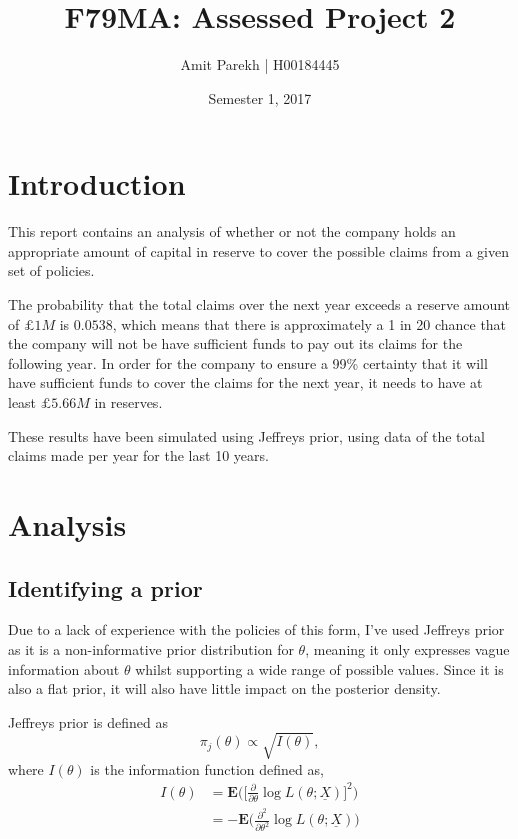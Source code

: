 \documentclass[11pt,a4paper]{article}
\title{F79MA: Assessed Project 2}
\author{Amit Parekh | H00184445}
\date{Semester 1, 2017}
\newcommand{\E}{\textbf{E}}
\renewcommand{\th}{\theta}
\begin{document}
\maketitle
\thispagestyle{empty}

\section{Introduction}

This report contains an analysis of whether or not the company holds an appropriate amount of capital in reserve to cover the possible claims from a given set of policies. 

The probability that the total claims over the next year exceeds a reserve amount of $£1M$ is $0.0538$, which means that there is approximately a 1 in 20 chance that the company will not be have sufficient funds to pay out its claims for the following year. In order for the company to ensure a 99\% certainty that it will have sufficient funds to cover the claims for the next year, it needs to have at least $£5.66M$ in reserves. 

These results have been simulated using Jeffreys prior, using data of the total claims made per year for the last 10 years. 

\section{Analysis}

\subsection{Identifying a prior}

Due to a lack of experience with the policies of this form, I've used Jeffreys prior as it is a non-informative prior distribution for $\th$, meaning it only expresses vague information about $\th$ whilst supporting a wide range of possible values. Since it is also a flat prior, it will also have little impact on the posterior density. 

Jeffreys prior is defined as $$ \pi_j(\th) \propto \sqrt{I(\th)}, $$ where $I(\th)$ is the information function defined as,
\begin{align*}
    I(\th) &= \E \bigg( \Big[\frac{\partial}{\partial\th} \log L(\th; \underline X) \Big]^2 \bigg) \\
           &= - \E \bigg( \frac{\partial^2}{\partial\th^2} \log L(\th; \underline X) \bigg)
\end{align*}
\end{document}
